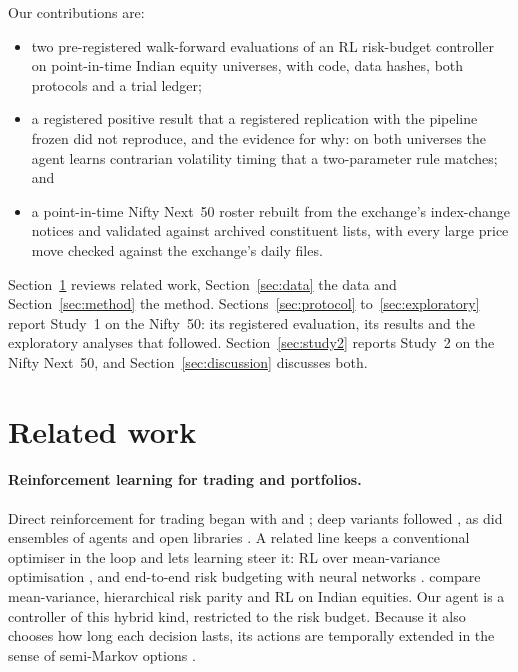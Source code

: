 \documentclass[11pt]{article}
\begin{document}
Our contributions are:
\begin{itemize}
\item two pre-registered walk-forward evaluations of an RL risk-budget controller on point-in-time Indian equity universes, with code, data hashes, both protocols and a trial ledger;
\item a registered positive result that a registered replication with the pipeline frozen did not reproduce, and the evidence for why: on both universes the agent learns contrarian volatility timing that a two-parameter rule matches; and
\item a point-in-time Nifty Next~50 roster rebuilt from the exchange's index-change notices and validated against archived constituent lists, with every large price move checked against the exchange's daily files.
\end{itemize}
Section~\ref{sec:related} reviews related work, Section~\ref{sec:data} the data and Section~\ref{sec:method} the method. Sections~\ref{sec:protocol} to~\ref{sec:exploratory} report Study~1 on the Nifty~50: its registered evaluation, its results and the exploratory analyses that followed. Section~\ref{sec:study2} reports Study~2 on the Nifty Next~50, and Section~\ref{sec:discussion} discusses both.

\section{Related work}\label{sec:related}

\paragraph{Reinforcement learning for trading and portfolios.} Direct reinforcement for trading began with \citet{moody1998} and \citet{moody2001}; deep variants followed \citep{deng2017,jiang2017,zhang2020drl}, as did ensembles of agents \citep{yang2020ensemble} and open libraries \citep{liu2020finrl}. A related line keeps a conventional optimiser in the loop and lets learning steer it: RL over mean-variance optimisation \citep{pretorius2022,sood2023}, and end-to-end risk budgeting with neural networks \citep{uysal2024}. \citet{sen2023} compare mean-variance, hierarchical risk parity and RL on Indian equities. Our agent is a controller of this hybrid kind, restricted to the risk budget. Because it also chooses how long each decision lasts, its actions are temporally extended in the sense of semi-Markov options \citep{sutton1999options}.
\end{document}
